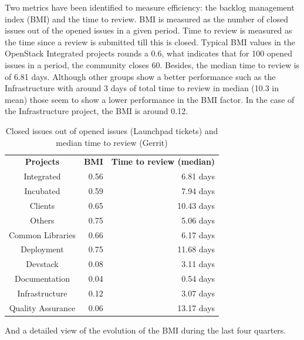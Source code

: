 \documentclass[a4wide,11pt]{report}
\begin{document}



Two metrics have been identified to measure efficiency: the backlog management index (BMI) and the time to review. BMI is measured as the number of closed issues out of the opened issues in a given period. Time to review is measured as the time since a review is submitted till this
is closed. Typical BMI values in the OpenStack Integrated projects rounds a 0.6, what indicates that for 100 opened issues in a period, the community closes 60. Besides, the median time to review is of 6.81 days. Although other groups show a better
performance such as the Infrastructure with around 3 days of total time to review in median (10.3 in mean) those seem to show a lower performance in the BMI factor. In the case of the Infrastructure project, the BMI is around 0.12.


\begin{table}[H]
\centering
\begin{tabular}{c|r|r|} 
\textbf{Projects} & \textbf{BMI} & \textbf{Time to review (median)} \\
Integrated &  0.56 & 6.81 days\\
Incubated & 0.59 & 7.94 days\\
Clients & 0.65 & 10.43 days\\
Others & 0.75 & 5.06 days\\
Common Libraries & 0.66 & 6.17 days\\
Deployment & 0.75 & 11.68 days\\
Devstack & 0.08 & 3.11 days\\
Documentation & 0.04 & 0.54 days\\
Infrastructure & 0.12 & 3.07 days\\
Quality Assurance & 0.06 & 13.17 days\\
\end{tabular}
\caption{Closed issues out of opened issues (Launchpad tickets) and median time to review (Gerrit)}
\end{table}

And a detailed view of the evolution of the BMI during the last four quarters.
\end{document}
